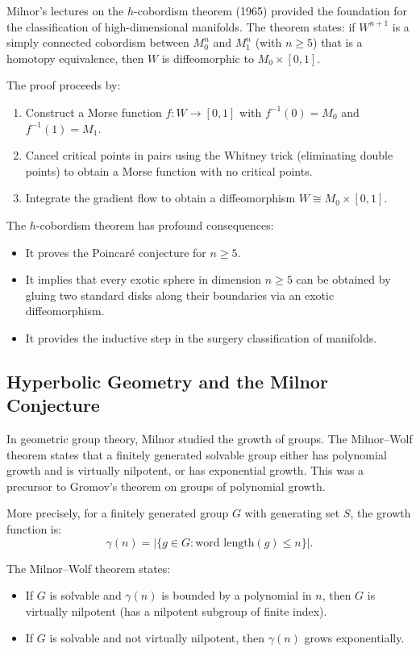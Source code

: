 Milnor's lectures on the $h$-cobordism theorem (1965) provided the foundation for the classification of high-dimensional manifolds. The theorem states: if $W^{n+1}$ is a simply connected cobordism between $M_0^n$ and $M_1^n$ (with $n \geq 5$) that is a homotopy equivalence, then $W$ is diffeomorphic to $M_0 \times [0,1]$.

The proof proceeds by:
\begin{enumerate}
\item Construct a Morse function $f: W \to [0,1]$ with $f^{-1}(0) = M_0$ and $f^{-1}(1) = M_1$.
\item Cancel critical points in pairs using the Whitney trick (eliminating double points) to obtain a Morse function with no critical points.
\item Integrate the gradient flow to obtain a diffeomorphism $W \cong M_0 \times [0,1]$.
\end{enumerate}

The $h$-cobordism theorem has profound consequences:
\begin{itemize}
\item It proves the Poincaré conjecture for $n \geq 5$.
\item It implies that every exotic sphere in dimension $n \geq 5$ can be obtained by gluing two standard disks along their boundaries via an exotic diffeomorphism.
\item It provides the inductive step in the surgery classification of manifolds.
\end{itemize}

\subsection{Hyperbolic Geometry and the Milnor Conjecture}

In geometric group theory, Milnor studied the growth of groups. The Milnor--Wolf theorem states that a finitely generated solvable group either has polynomial growth and is virtually nilpotent, or has exponential growth. This was a precursor to Gromov's theorem on groups of polynomial growth.

More precisely, for a finitely generated group $G$ with generating set $S$, the growth function is:
\[
\gamma(n) = |\{g \in G : \text{word length}(g) \leq n\}|.
\]

The Milnor--Wolf theorem states:
\begin{itemize}
\item If $G$ is solvable and $\gamma(n)$ is bounded by a polynomial in $n$, then $G$ is virtually nilpotent (has a nilpotent subgroup of finite index).
\item If $G$ is solvable and not virtually nilpotent, then $\gamma(n)$ grows exponentially.
\end{itemize}

